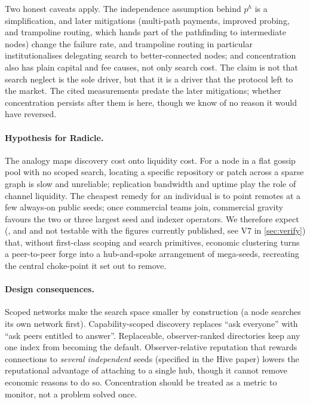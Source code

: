 \documentclass[a4paper,11pt,twoside,parskip=half-,headings=small]{scrartcl}
\begin{document}
Two honest caveats apply. The independence assumption behind $p^{h}$ is a simplification, and later mitigations (multi-path payments, improved probing, and trampoline routing, which hands part of the pathfinding to intermediate nodes) change the failure rate, and trampoline routing in particular institutionalises delegating search to better-connected nodes; and concentration also has plain capital and fee causes, not only search cost. The claim is not that search neglect is the sole
driver, but that it is a driver that the protocol left to the market. The cited measurements predate the later mitigations; whether concentration persists after them is  here, though we know of no reason it would have reversed.

\paragraph{Hypothesis for Radicle.} The analogy maps discovery cost onto liquidity cost. For a node in a flat gossip pool with no scoped search, locating a specific
repository or patch across a sparse graph is slow and unreliable; replication bandwidth and uptime play the role of channel liquidity. The cheapest remedy
for an individual is to point remotes at a few always-on public seeds; once commercial teams join, commercial gravity favours the two or three largest seed and indexer operators.
We therefore expect (, and and not testable with the figures currently published, see V7 in \cref{sec:verify}) that, without first-class scoping and search primitives, economic clustering
turns a peer-to-peer forge into a hub-and-spoke arrangement of mega-seeds, recreating the central choke-point it set out to remove.

\paragraph{Design consequences.} Scoped networks make the search space smaller by construction (a node searches its own network first). Capability-scoped
discovery replaces ``ask everyone'' with ``ask peers entitled to answer''. Replaceable, observer-ranked directories keep any one index from becoming the default.
Observer-relative reputation that rewards connections to \emph{several independent} seeds (specified in the Hive paper) lowers the reputational advantage of attaching to a single hub, though it
cannot remove economic reasons to do so. Concentration should be treated as a metric to monitor, not a problem solved once.
\end{document}
